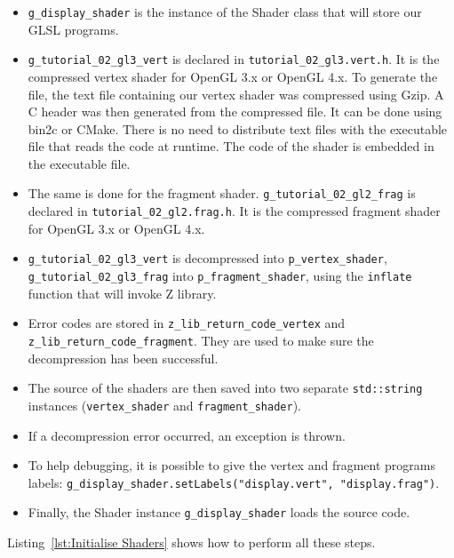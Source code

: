 \documentclass[11pt,oneside,a4paper,final]{article}
\begin{document}
\begin{itemize}
\item \verb+g_display_shader+ is the instance of the Shader class that will store our GLSL programs. 

\item \verb+g_tutorial_02_gl3_vert+  is declared in \verb+tutorial_02_gl3.vert.h+. 
 It is the compressed vertex shader for OpenGL 3.x or OpenGL 4.x. 
 To generate the file, the text file containing our vertex shader was compressed using Gzip. 
 A C header was then generated from the compressed file. 
 It can be done using bin2c or CMake. 
 There is no need to distribute text files with the executable file that reads the code at runtime. 
 The code of the shader is embedded in the executable file. 

\item  The same is done for the fragment shader.  
\verb+g_tutorial_02_gl2_frag+  is declared in \verb+tutorial_02_gl2.frag.h+. 
 It is the compressed fragment shader for OpenGL 3.x or OpenGL 4.x.

\item \verb+g_tutorial_02_gl3_vert+ is decompressed into \verb+p_vertex_shader+, 
\verb+g_tutorial_02_gl3_frag+ into \verb+p_fragment_shader+, using the \verb+inflate+ function that will invoke Z library. 

\item Error codes are stored in \verb+z_lib_return_code_vertex+ and \verb+z_lib_return_code_fragment+. 
They are used to make sure the decompression has been successful. 

\item The source of the shaders are then saved into two separate \verb+std::string+ instances (\verb+vertex_shader+ and \verb+fragment_shader+). 

\item If a decompression error occurred, an exception is thrown. 

\item To help debugging, it is possible to give the vertex and fragment programs labels: 
\verb+g_display_shader.setLabels("display.vert", "display.frag")+. 

\item Finally, the Shader instance \verb+g_display_shader+ loads the source code. 
\end{itemize}
Listing~\ref{lst:Initialise Shaders} shows how to perform all these steps.
\begin{center}

\end{center}
\end{document}
